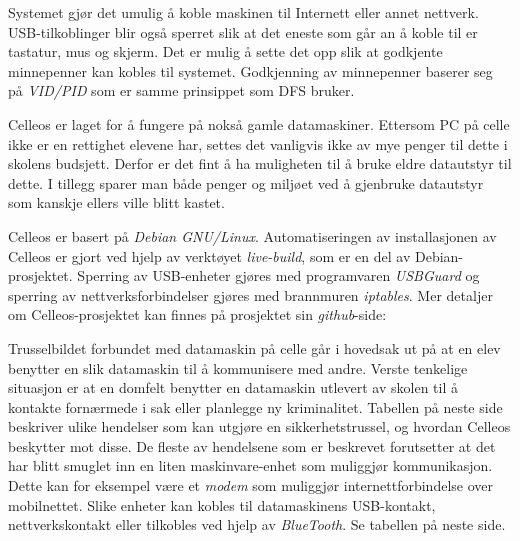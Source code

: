 Systemet gj\o r det umulig \aa{} koble maskinen til Internett eller annet nettverk. USB-tilkoblinger blir ogs\aa{} sperret slik at det eneste som g\aa r an \aa{} koble til er tastatur, mus og skjerm. Det er mulig \aa{} sette det opp slik at godkjente minnepenner kan kobles til systemet. Godkjenning av minnepenner baserer seg p\aa{} {\it VID/PID} som er samme prinsippet som DFS bruker.

Celleos er laget for \aa{} fungere p\aa{} noks\aa{} gamle datamaskiner. Ettersom PC p\aa{} celle ikke er en rettighet elevene har, settes det vanligvis ikke av mye penger til dette i skolens budsjett. Derfor er det fint \aa{} ha muligheten til \aa{} bruke eldre datautstyr til dette. I tillegg sparer man b\aa de penger og milj\o et ved \aa{} gjenbruke datautstyr som kanskje ellers ville blitt kastet.


Celleos er basert p\aa{} {\it Debian GNU/Linux}. Automatiseringen av installasjonen av Celleos er gjort ved hjelp av verkt\o yet {\it live-build}, som er en del av Debian-prosjektet. Sperring av USB-enheter gj\o res med programvaren {\it USBGuard} og sperring av nettverksforbindelser gj\o res med brannmuren {\it iptables}. Mer detaljer om Celleos-prosjektet kan finnes p\aa{} prosjektet sin {\it github}-side:
\smallskip
{}


Trusselbildet forbundet med datamaskin p\aa{} celle g\aa r i hovedsak ut p\aa{} at en elev benytter en slik datamaskin til \aa{} kommunisere med andre. Verste tenkelige situasjon er at en domfelt benytter en datamaskin utlevert av skolen til \aa{} kontakte forn\ae rmede i sak eller planlegge ny kriminalitet.
Tabellen p\aa{} neste side beskriver ulike hendelser som kan utgj\o re en sikkerhetstrussel, og hvordan Celleos beskytter mot disse. De fleste av hendelsene som er beskrevet forutsetter at det har blitt smuglet inn en liten maskinvare-enhet som muliggj\o r kommunikasjon. Dette kan for eksempel v\ae re et {\it modem} som muliggj\o r internettforbindelse over mobilnettet. Slike enheter kan kobles til datamaskinens USB-kontakt, nettverkskontakt eller tilkobles ved hjelp av {\it BlueTooth}. Se tabellen p\aa{} neste side.

\vfill\eject
\topglue 1pc

\def\firstcolwidth{12pc}
\def\secondcolwidth{19pc}
\def\tablerow#1#2{
\vbox{
\btexdraw
\drawdim pc
\textref h:L v:T
\move(0 0) \htext{\vbox{\hsize=\firstcolwidth \noindent\raggedright #1}}
\move(16 0) \htext{\vbox{\hsize=\secondcolwidth \noindent\raggedright #2}}
\etexdraw
}}
\def\tablehline{
\vbox{
\btexdraw
\drawdim pc
\move(0 0) \linewd 0.01 \lvec(35 0)
\etexdraw}
}

